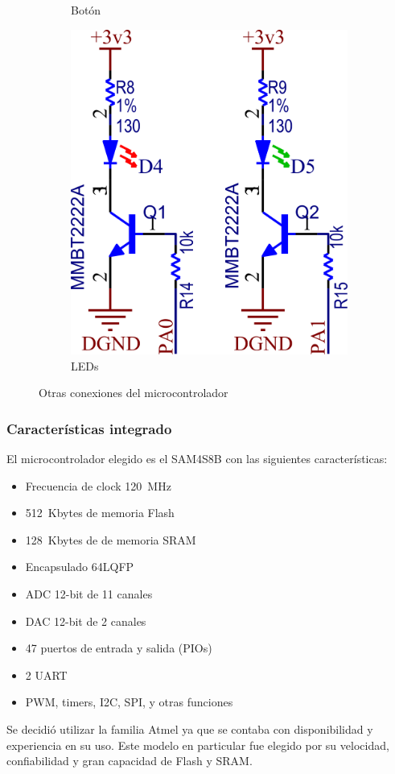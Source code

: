 \documentclass[../et.tex]{subfiles}
\begin{document}
\begin{figure}[!htbp]
\begin{subfigure}[b]{0.49\textwidth}
    \caption{Botón}
    \label{fig:arm-button}
  \end{subfigure}
  \begin{subfigure}[b]{0.49\textwidth}
    \centering
    \includegraphics[scale=1.1]{../images/arm-leds.png}
    \caption{LEDs}
    \label{fig:arm-leds}
  \end{subfigure}
  \caption{Otras conexiones del microcontrolador}
\end{figure}

\subsubsection{Características integrado}
El microcontrolador elegido es el SAM4S8B con las siguientes características:

\begin{itemize}
  \item Frecuencia de clock \SI{120}{MHz}
  \item \SI{512}{Kbytes} de memoria Flash
  \item \SI{128}{Kbytes} de de memoria SRAM
  \item Encapsulado 64LQFP
  \item ADC 12-bit de 11 canales
  \item DAC 12-bit de 2 canales
  \item 47 puertos de entrada y salida (PIOs)
  \item 2 UART
  \item PWM, timers, I2C, SPI, y otras funciones
\end{itemize}

Se decidió utilizar la familia Atmel ya que se contaba con disponibilidad y experiencia en su uso. Este modelo en particular fue elegido por su velocidad, confiabilidad y gran capacidad de Flash y SRAM.
\end{document}
